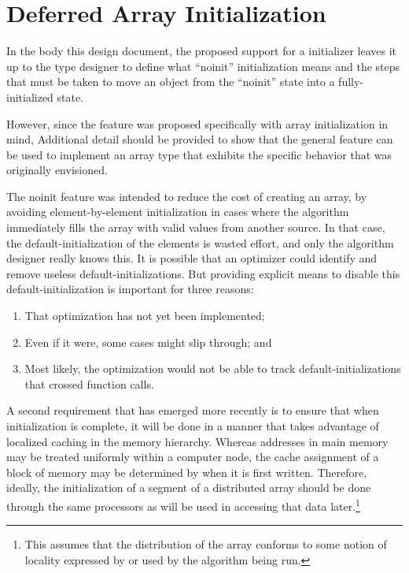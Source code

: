 \section{Deferred Array Initialization}

In the body this design document, the proposed support for a  initializer
leaves it up to the type designer to define what ``noinit'' initialization means and the
steps that must be taken to move an object from the ``noinit'' state into a
fully-initialized state.

However, since the  feature was proposed specifically with array
initialization in mind, Additional detail should be provided to show that the general
feature can be used to implement an array type that exhibits the specific behavior that
was originally envisioned.

The noinit feature was intended to reduce the cost of creating an array, by avoiding
element-by-element initialization in cases where the algorithm immediately fills the array
with valid values from another source.  In that case, the default-initialization of the
elements is wasted effort, and only the algorithm designer really knows this.  It is
possible that an optimizer could identify and remove useless default-initializations.  But
providing explicit means to disable this default-initialization is important for three
reasons:
\begin{enumerate}
\item That optimization has not yet been implemented;
\item Even if it were, some cases might slip through; and
\item Most likely, the optimization would not be able to track default-initializations
  that crossed function calls.
\end{enumerate}

A second requirement that has emerged more recently is to ensure that when initialization is
complete, it will be done in a manner that takes advantage of localized caching in the
memory hierarchy.  Whereas addresses in main memory may be treated uniformly within a
computer node, the cache assignment of a block of memory may be determined by when it is
first written.  Therefore, ideally, the initialization of a segment of a distributed array
should be done through the same processors as will be used in accessing that data
later.\footnote{This assumes that the distribution of the array conforms to some
  notion of locality expressed by or used by the algorithm being run.}

